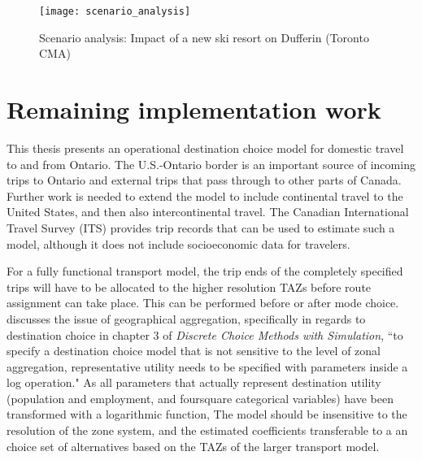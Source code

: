 \begin{figure}[H]
\centering
\texttt{[image: scenario\_analysis]}
\caption{Scenario analysis: Impact of a new ski resort on Dufferin (Toronto CMA)}
\label{fig:scenario-results}
\end{figure}


\section{Remaining implementation work}
This thesis presents an operational destination choice model for domestic travel to and from Ontario. The U.S.-Ontario border is an important source of incoming trips to Ontario and external trips that pass through to other parts of Canada. Further work is needed to extend the model to include continental travel to the United States, and then also intercontinental travel. The Canadian International Travel Survey (ITS) provides trip records that can be used to estimate such a model, although it does not include socioeconomic data for travelers. 

For a fully functional transport model, the trip ends of the completely specified trips will have to be allocated to the higher resolution TAZs before route assignment can take place. This can be performed before or after mode choice. \textcite{Train09} discusses the issue of geographical aggregation, specifically in regards to destination choice in chapter 3 of \textit{Discrete Choice Methods with Simulation}, 
``to specify a destination choice model that is not sensitive to the level of zonal aggregation, representative utility needs to be specified with parameters inside a log operation."
As all parameters that actually represent destination utility (population and employment, and foursquare categorical variables) have been transformed with a logarithmic function, The model should be insensitive to the resolution of the zone system, and the estimated coefficients transferable to a an choice set of alternatives based on the TAZs of the larger transport model.
